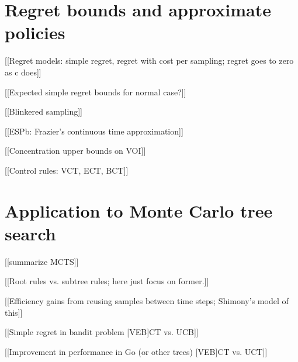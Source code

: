 \documentclass{article}
\begin{document}
\section{Regret bounds and approximate policies}

[[Regret models: simple regret, regret with cost per sampling; regret goes to zero as c does]]

[[Expected simple regret bounds for normal case?]]


[[Blinkered sampling]]

[[ESPb: Frazier's continuous time approximation]]




[[Concentration upper bounds on VOI]]

[[Control rules: VCT, ECT, BCT]]



\section{Application to Monte Carlo tree search}

[[summarize MCTS]]

[[Root rules vs. subtree rules; here just focus on former.]]

[[Efficiency gains from reusing samples between time steps; Shimony's model of this]]

[[Simple regret in bandit problem [VEB]CT vs. UCB]]

[[Improvement in performance in Go (or other trees) [VEB]CT vs. UCT]]
\end{document}

